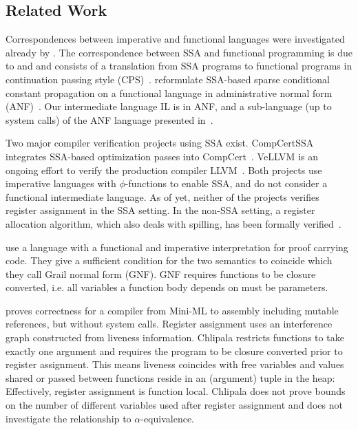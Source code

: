 \documentclass[openright,a4paper,11pt]{scrartcl}
\theoremstyle{plain}
\theoremstyle{plain}
\theoremstyle{plain}
\theoremstyle{plain}
\theoremstyle{nonumberplain}
\begin{document}
 \subsection{Related Work}
\label{chap:relwork}



Correspondences between imperative and functional languages were investigated already by \textcite{DBLP:journals/cacm/Landin65}.
The correspondence between SSA and functional programming is due to \textcite{DBLP:journals/sigplan/Appel98} and \textcite{Kelsey:1995} and consists of a translation from SSA programs to functional programs in continuation passing style (CPS)~\cite{DBLP:journals/lisp/Reynolds93,Appel92}.
\textcite{DBLP:journals/entcs/ChakravartyKZ03} reformulate SSA-based sparse conditional constant propagation on a functional language in administrative normal form (ANF)~\cite{DBLP:journals/lisp/SabryF93}.
Our intermediate language IL is in ANF, and a sub-language (up to system calls) of the ANF language presented in~\textcite{DBLP:journals/entcs/ChakravartyKZ03}.

Two major compiler verification projects using SSA exist.
{Comp\-Cert\-SSA} \cite{DBLP:conf/esop/BartheDP12} integrates SSA-based optimization passes into CompCert~\cite{Leroy-Compcert-CACM}.
VeLLVM \cite{DBLP:conf/popl/ZhaoNMZ12,DBLP:conf/pldi/ZhaoNMZ13}  is an ongoing effort to verify the production compiler LLVM~\cite{DBLP:conf/cgo/LattnerA04}.
Both projects use imperative languages with $\phi$-functions to enable SSA, and do not consider a functional intermediate language.
As of yet, neither of the projects verifies register assignment in the SSA setting.
In the non-SSA setting, a register allocation algorithm, which also deals with spilling, has been formally verified~\cite{DBLP:conf/esop/BlazyRA10}.


\textcite{DBLP:journals/entcs/BeringerMS03} use a language with a functional and imperative interpretation for proof carrying code.
They give a sufficient condition for the two semantics to coincide which they call Grail normal form (GNF).
GNF requires functions to be closure converted, i.e. all variables a function body depends on must be parameters.

\textcite{DBLP:conf/popl/Chlipala10} proves correctness for a compiler from Mini-ML to assembly including mutable references, but without system calls.
Register assignment uses an interference graph constructed from liveness information.
Chlipala restricts functions to take exactly one argument and requires the program to be closure converted prior to register assignment.
This means liveness coincides with free variables and values shared or passed between functions reside in an (argument) tuple in the heap: Effectively, register assignment is function local.
Chlipala does not prove bounds on the number of different variables used after register assignment and does not investigate the relationship to $\alpha$-equivalence.
\end{document}
